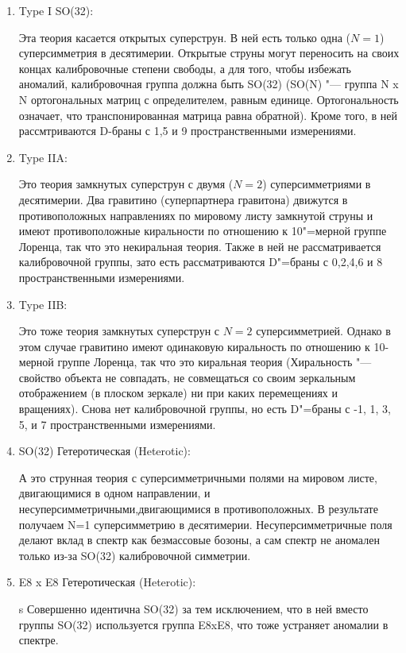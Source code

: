 \begin{enumerate}
    \item Type I SO(32):
    
    Эта теория касается открытых суперструн. В ней есть только одна ($N=1$) суперсимметрия в десятимерии.
    Открытые струны могут переносить на своих концах калибровочные степени свободы, 
    а для того, чтобы избежать аномалий, калибровочная группа должна быть SO(32) (SO(N) "--- 
    группа N x N ортогональных матриц с определителем, равным единице.
    Ортогональность означает, что транспонированная матрица равна обратной).
    Кроме того, в ней рассмтриваются D-браны с 1,5 и 9 пространственными измерениями. 

    \item Type IIA:

    Это теория замкнутых суперструн с двумя ($N=2$) суперсимметриями в десятимерии. 
    Два гравитино (суперпартнера гравитона) движутся в противоположных направлениях по мировому листу замкнутой струны и имеют противоположные киральности по отношению к 10"=мерной группе Лоренца, так что это некиральная теория.
    Также в ней не рассматривается калибровочной группы, зато есть рассматриваются D"=браны с 0,2,4,6 и 8 пространственными измерениями.

    \item Type IIB:
    
    Это тоже теория замкнутых суперструн с $N=2$ суперсимметрией.
    Однако в этом случае гравитино имеют одинаковую киральность по отношению к 10-мерной группе Лоренца,
    так что это киральная теория (Хиральность "--- свойство объекта не совпадать, не совмещаться со своим зеркальным отображением
    (в плоском зеркале) ни при каких перемещениях и вращениях).
    Снова нет калибровочной группы, но есть D"=браны с -1, 1, 3, 5, и 7 пространственными измерениями. 

    \item SO(32) Гетеротическая (Heterotic):
    
    А это струнная теория с суперсимметричными полями на мировом листе,
    двигающимися в одном направлении, и несуперсимметричными,двигающимися в противоположных.
    В результате получаем N=1 суперсимметрию в десятимерии.
    Несуперсимметричные поля делают вклад в спектр как безмассовые бозоны,
    а сам спектр не аномален только из-за SO(32) калибровочной симметрии. 

    \item E8 x E8 Гетеротическая (Heterotic):
    
    s Совершенно идентична SO(32) за тем исключением,
    что в ней вместо группы SO(32) используется группа E8xE8,
    что тоже устраняет аномалии в спектре.
\end{enumerate}
